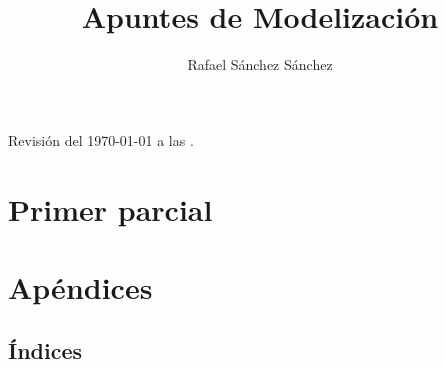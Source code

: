 \documentclass{book}
\title{Apuntes de Modelizaci\'on}
\author{Rafael S\'{a}nchez S\'{a}nchez}
\newcommand{\0}{\mathbf{0}}
\newcommand{\1}{\mathbf{1}}
\begin{document}
\begin{titlepage}
	
\end{titlepage}


Revisión del \today $ $ a las \currenttime.

\begin{center}

\end{center}

\tableofcontents
\part{Primer parcial}


% 
% 
% 
\part{Apéndices}


%


%

\chapter{\'{I}ndices}

\renewcommand{\listtheoremname}{Lista de definiciones}
\listoftheorems[ignore={thm,eg,pro,cor,obs,lm,ex,th_ex}]

\renewcommand{\listtheoremname}{Lista de teoremas}
\listoftheorems[onlynamed,ignore={dfn,eg,cor,obs,ex,th_ex}]

\renewcommand{\listtheoremname}{Lista de ejemplos}
\listoftheorems[onlynamed,ignore={dfn,thm,pro,cor,obs,lm,ex,th_ex}]

\renewcommand{\listtheoremname}{Lista de ejercicios}
\listoftheorems[ignore={dfn,thm,pro,cor,obs,lm,eg}]

\printglossaries


\end{document}
